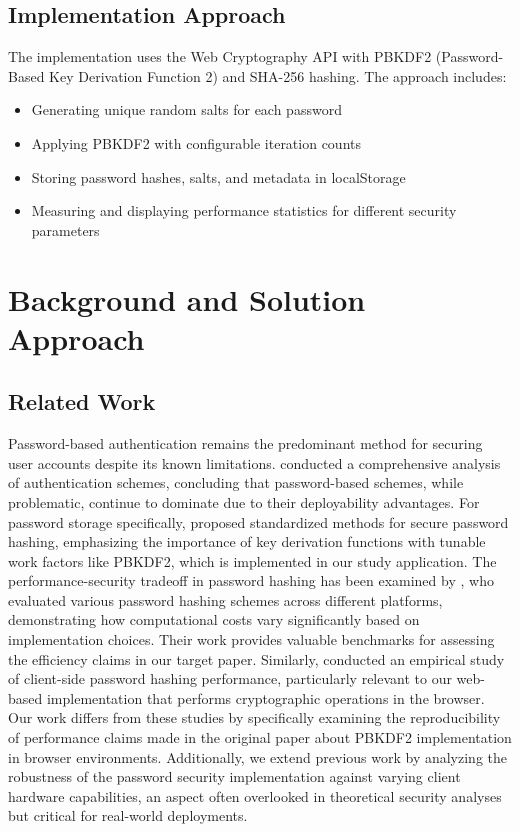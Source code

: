 \documentclass[11pt,a4paper]{article}
\begin{document}
            \subsection{Implementation Approach} 
            The implementation uses the Web Cryptography API with PBKDF2 (Password-Based Key Derivation Function 2) and SHA-256 hashing. The approach includes:
            \begin{itemize}
              \item Generating unique random salts for each password
              \item Applying PBKDF2 with configurable iteration counts
              \item Storing password hashes, salts, and metadata in localStorage
              \item Measuring and displaying performance statistics for different security parameters
            \end{itemize}


\section{Background and Solution Approach} 
\subsection{Related Work}
Password-based authentication remains the predominant method for securing user accounts despite its known limitations. \cite{bonneau2012quest} conducted a comprehensive analysis of authentication schemes, concluding that password-based schemes, while problematic, continue to dominate due to their deployability advantages. For password storage specifically, \cite{turan2018recommendation} proposed standardized methods for secure password hashing, emphasizing the importance of key derivation functions with tunable work factors like PBKDF2, which is implemented in our study application.
The performance-security tradeoff in password hashing has been examined by \cite{visconti2020evaluate}, who evaluated various password hashing schemes across different platforms, demonstrating how computational costs vary significantly based on implementation choices. Their work provides valuable benchmarks for assessing the efficiency claims in our target paper. Similarly, \cite{pesante2021empirical} conducted an empirical study of client-side password hashing performance, particularly relevant to our web-based implementation that performs cryptographic operations in the browser. Our work differs from these studies by specifically examining the reproducibility of performance claims made in the original paper about PBKDF2 implementation in browser environments. Additionally, we extend previous work by analyzing the robustness of the password security implementation against varying client hardware capabilities, an aspect often overlooked in theoretical security analyses but critical for real-world deployments.
\end{document}
